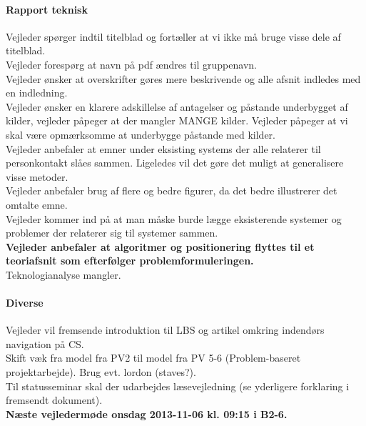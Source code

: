 \documentclass[article,oneside,11pt]{memoir}
\begin{document}
\paragraph{Rapport teknisk}
Vejleder spørger indtil titelblad og fortæller at vi ikke må bruge visse dele af titelblad. \\
Vejleder forespørg at navn på pdf ændres til gruppenavn.\\
Vejleder ønsker at overskrifter gøres mere beskrivende og alle afsnit indledes med en indledning.\\
Vejleder ønsker en klarere adskillelse af antagelser og påstande underbygget af kilder, vejleder påpeger at der mangler MANGE kilder. Vejleder påpeger at vi skal være opmærksomme at underbygge påstande med kilder.\\
Vejleder anbefaler at emner under eksisting systems der alle relaterer til personkontakt slåes sammen. Ligeledes vil det gøre det muligt at generalisere visse metoder.\\
Vejleder anbefaler brug af flere og bedre figurer, da det bedre illustrerer det omtalte emne.\\
Vejleder kommer ind på at man måske burde lægge eksisterende systemer og problemer der relaterer sig til systemer sammen.\\
\textbf{Vejleder anbefaler at algoritmer og positionering flyttes til et teoriafsnit som efterfølger problemformuleringen.}\\
Teknologianalyse mangler.\\

\paragraph{Diverse}
Vejleder vil fremsende introduktion til LBS og artikel omkring indendørs navigation på CS.\\
Skift væk fra model fra PV2 til model fra PV 5-6 (Problem-baseret projektarbejde). Brug evt. lordon (staves?).\\
Til statusseminar skal der udarbejdes læsevejledning (se yderligere forklaring i fremsendt dokument).\\

\textbf{Næste vejledermøde onsdag 2013-11-06 kl. 09:15 i B2-6.}
\end{document}
